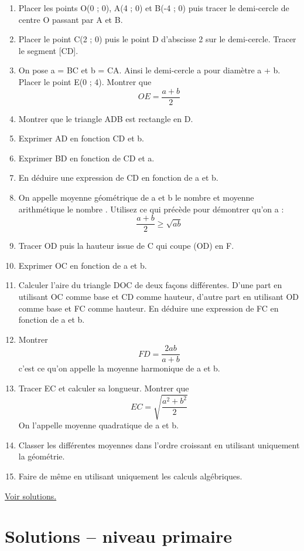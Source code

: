 \documentclass[11pt]{article}
\begin{document}
\begin{enumerate}
\item Placer les points O(0 ; 0), A(4 ; 0) et B(-4 ; 0) puis tracer le
demi-cercle de centre O passant par A et B.
\item Placer le point C(2 ; 0) puis le point D d'abscisse 2 sur le
demi-cercle. Tracer le segment [CD].
\item On pose a = BC et b = CA. Ainsi le demi-cercle a pour diamètre
a + b. Placer le point E(0 ; 4). Montrer que \[OE = \frac{a +
   b}{2}\]
\item Montrer que le triangle ADB est rectangle en D.
\item Exprimer AD en fonction CD et b.
\item Exprimer BD en fonction de CD et a.
\item En déduire une expression de CD en fonction de a et b.
\item On appelle moyenne géométrique de a et b le nombre  et
moyenne arithmétique le nombre . Utilisez ce qui
précède pour démontrer qu'on a : \[\frac{a+b}{2} \geq \sqrt{ab}\]
\item Tracer OD puis la hauteur issue de C qui coupe (OD) en F.
\item Exprimer OC en fonction de a et b.
\item Calculer l'aire du triangle DOC de deux façons différentes. D'une
part en utilisant OC comme base et CD comme hauteur, d'autre part
en utilisant OD comme base et FC comme hauteur. En déduire une
expression de FC en fonction de a et b.
\item Montrer \[FD = \frac{2ab}{a + b}\] c'est ce qu'on appelle la
moyenne harmonique de a et b.
\item Tracer EC et calculer sa longueur. Montrer que \[EC =
   \sqrt{\frac{a^2 + b^2}{2}}\]
On l'appelle moyenne quadratique de a et b.
\item Classer les différentes moyennes dans l'ordre croissant en
utilisant uniquement la géométrie.
\item Faire de même en utilisant uniquement les calculs algébriques.
\end{enumerate}

\hyperref[org1773b9c]{Voir solutions.}

\newpage


\section{Solutions – niveau primaire}
\label{sec:org33afe16}
\end{document}
